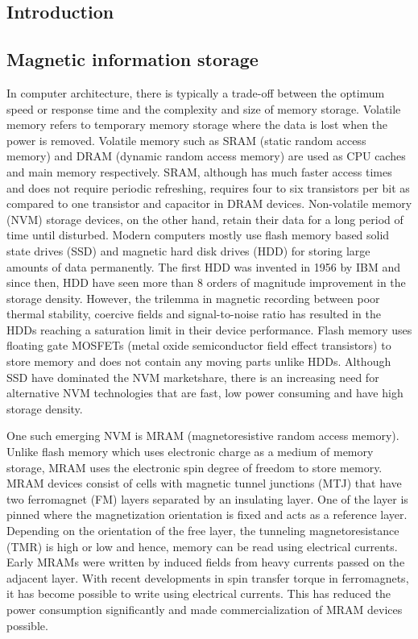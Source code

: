 \documentclass[11pt,edeposit,draftthesis]{uiucthesis2020}
\begin{document}
\begin{mainmatter}

\chapter{Introduction}

\section{Magnetic information storage}

In computer architecture, there is typically a trade-off between the optimum speed or response time and the complexity and size of memory storage. Volatile memory refers to temporary memory storage where the data is lost when the power is removed. Volatile memory such as SRAM (static random access memory) and DRAM (dynamic random access memory) are used as CPU caches and main memory respectively. SRAM, although has much faster access times and does not require periodic refreshing, requires four to six transistors per bit as compared to one transistor and capacitor in DRAM devices. Non-volatile memory (NVM) storage devices, on the other hand, retain their data for a long period of time until disturbed. Modern computers mostly use flash memory based solid state drives (SSD) and magnetic hard disk drives (HDD) for storing large amounts of data permanently. The first HDD was invented in 1956 by IBM and since then, HDD have seen more than 8 orders of magnitude improvement in the storage density. However, the trilemma in magnetic recording between poor thermal stability, coercive fields and signal-to-noise ratio has resulted in the HDDs reaching a saturation limit in their device performance. Flash memory uses floating gate MOSFETs (metal oxide semiconductor field effect transistors) to store memory and does not contain any moving parts unlike HDDs. Although SSD have dominated the NVM marketshare, there is an increasing need for alternative NVM technologies that are fast, low power consuming and have high storage density.

One such emerging NVM is MRAM (magnetoresistive random access memory). Unlike flash memory which uses electronic charge as a medium of memory storage, MRAM uses the electronic spin degree of freedom to store memory. MRAM devices consist of cells with magnetic tunnel junctions (MTJ) that have two ferromagnet (FM) layers separated by an insulating layer. One of the layer is pinned where the magnetization orientation is fixed and acts as a reference layer. Depending on the orientation of the free layer, the tunneling magnetoresistance (TMR) is high or low and hence, memory can be read using electrical currents. Early MRAMs were written by induced fields from heavy currents passed on the adjacent layer. With recent developments in spin transfer torque in ferromagnets, it has become possible to write using electrical currents. This has reduced the power consumption significantly and made commercialization of MRAM devices possible. 


\end{mainmatter}
\end{document}
